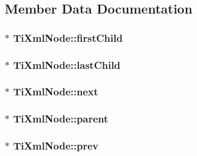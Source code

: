 \subsection{Member Data Documentation}
\hypertarget{class_ti_xml_node_af749fb7f22010b80e8f904c32653d50e}{
\subsubsection[{first\+Child}]{$\ast$ Ti\+Xml\+Node\+::first\+Child\hspace{0.3cm}{\ttfamily [protected]}}}\label{class_ti_xml_node_af749fb7f22010b80e8f904c32653d50e}
\hypertarget{class_ti_xml_node_a5b30756d21b304580d22a841ec9d61f8}{
\subsubsection[{last\+Child}]{$\ast$ Ti\+Xml\+Node\+::last\+Child\hspace{0.3cm}{\ttfamily [protected]}}}\label{class_ti_xml_node_a5b30756d21b304580d22a841ec9d61f8}
\hypertarget{class_ti_xml_node_a2f329cc993d2d34df76e17dcbb776b45}{
\subsubsection[{next}]{$\ast$ Ti\+Xml\+Node\+::next\hspace{0.3cm}{\ttfamily [protected]}}}\label{class_ti_xml_node_a2f329cc993d2d34df76e17dcbb776b45}
\hypertarget{class_ti_xml_node_a662c4de61244e4fa5bd4e2d8c63143a5}{
\subsubsection[{parent}]{$\ast$ Ti\+Xml\+Node\+::parent\hspace{0.3cm}{\ttfamily [protected]}}}\label{class_ti_xml_node_a662c4de61244e4fa5bd4e2d8c63143a5}
\hypertarget{class_ti_xml_node_a9c5370ea2cbfd9f0e0f7b30a57fd68f5}{
\subsubsection[{prev}]{$\ast$ Ti\+Xml\+Node\+::prev\hspace{0.3cm}{\ttfamily [protected]}}}\label{class_ti_xml_node_a9c5370ea2cbfd9f0e0f7b30a57fd68f5}
